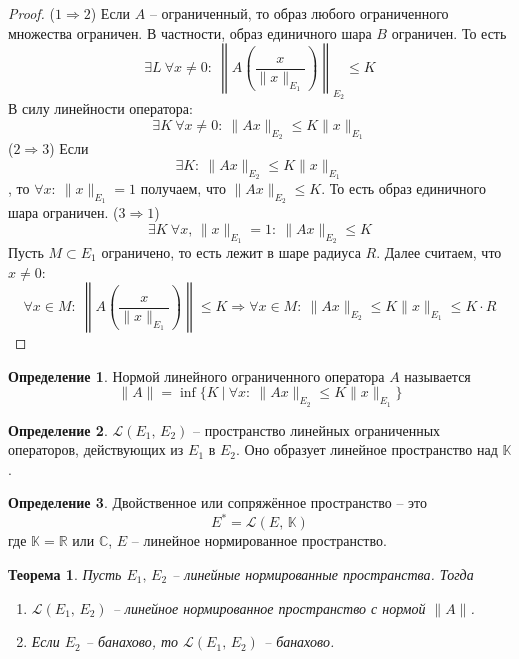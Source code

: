 \documentclass[a4paper,12pt]{article}
\renewcommand{\leq}{\ensuremath{\leqslant}}
\theoremstyle{plain}
\newtheorem{theorem}{Теорема}[section]
\theoremstyle{definition}
\newtheorem{definition}{Определение}[section]
\theoremstyle{remark}
\begin{document}
\begin{proof}
  ($1 \Rightarrow 2$) Если $A$ -- ограниченный, то образ любого ограниченного множества ограничен. В частности, образ единичного шара $B$ ограничен. То есть
  \[
    \exists L \: \forall x \neq 0 :\: \left\|A\left(\frac{x}{\|x\|_{E_1}}\right)\right\|_{E_2} \leq K
  \]
  В силу линейности оператора:
  \[
    \exists K \: \forall x \neq 0 :\: \|Ax\|_{E_2} \leq K\|x\|_{E_1}
  \]
  ($2 \Rightarrow 3$) Если 
  \[
    \exists K :\: \|Ax\|_{E_2} \leq K\|x\|_{E_1}
  \]
  , то $\forall x :\: \|x\|_{E_1} = 1$ получаем, что $\|Ax\|_{E_2} \leq K$. То есть образ единичного шара ограничен.
  ($3 \Rightarrow 1$) 
  \[
    \exists K \: \forall x,\, \|x\|_{E_1} = 1 :\: \|Ax\|_{E_2} \leq K
  \]
  Пусть $M \subset E_1$ ограничено, то есть лежит в шаре радиуса $R$. Далее считаем, что $x \neq 0$:
  \[
    \forall x \in M :\: \left\|A\left(\frac{x}{\|x\|_{E_1}}\right)\right\| \leq K \Rightarrow \forall x \in M :\: \|Ax\|_{E_2} \leq K\|x\|_{E_1} \leq K\cdot R
  \]
\end{proof}

\begin{definition}
  Нормой линейного ограниченного оператора $A$ называется
  \[
    \|A\| = \inf\{K \:\vert\: \forall x :\: \|Ax\|_{E_2} \leq K\|x\|_{E_1}\}
  \]
\end{definition}

\begin{definition}
  $\mathcal{L}(E_1,\, E_2)$ -- пространство линейных ограниченных операторов, действующих из $E_1$ в $E_2$. Оно образует линейное пространство над $\mathbb{K}$.
\end{definition}

\begin{definition}
  Двойственное или сопряжённое пространство -- это
  \[
    E^* = \mathcal{L}(E,\, \mathbb{K})
  \]
  где $\mathbb{K} = \mathbb{R}$ или $\mathbb{C}$, $E$ -- линейное нормированное пространство.
\end{definition}

\begin{theorem}
  Пусть $E_1,\, E_2$ -- линейные нормированные пространства. Тогда
  \begin{enumerate}
    \item $\mathcal{L}(E_1,\,E_2)$ -- линейное нормированное пространство с нормой $\|A\|$.
    \item Если $E_2$ -- банахово, то $\mathcal{L}(E_1,\, E_2)$ -- банахово.
  \end{enumerate}
\end{theorem}
\end{document}
